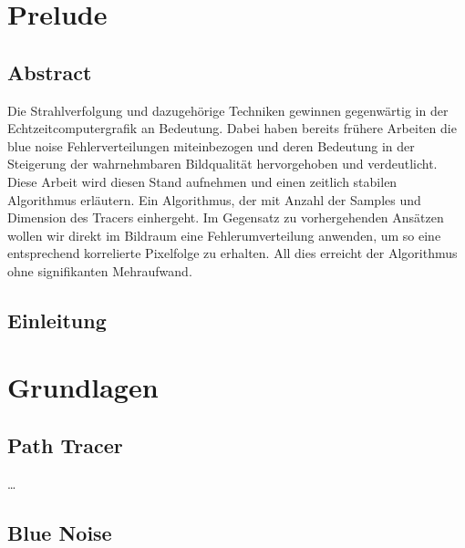 
\chapter{Prelude}
\label{ch:Introduction}

\section{Abstract}

\vspace*{\fill}
Die Strahlverfolgung und dazugehörige Techniken gewinnen gegenwärtig in der Echtzeitcomputergrafik an Bedeutung. Dabei haben bereits frühere Arbeiten
die blue noise Fehlerverteilungen miteinbezogen und deren Bedeutung in der Steigerung der wahrnehmbaren Bildqualität hervorgehoben und verdeutlicht.
Diese Arbeit wird diesen Stand aufnehmen und einen zeitlich stabilen Algorithmus erläutern. Ein Algorithmus, der mit Anzahl der Samples und Dimension
des Tracers einhergeht. Im Gegensatz zu vorhergehenden Ansätzen wollen wir direkt im Bildraum eine Fehlerumverteilung anwenden, um so eine entsprechend 
korrelierte Pixelfolge zu erhalten. All dies erreicht der Algorithmus ohne signifikanten Mehraufwand.
\vfill

\newpage

\section{Einleitung}

\chapter{Grundlagen}
\label{ch:Grundlagen}


\section{Path Tracer}
\label{ch:Content1:sec:PathTracer}


\dots


\newpage
\section{Blue Noise}
\label{ch:Content1:sec:BlueNoise}


